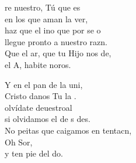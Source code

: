 \begin{cancion}%
	re nuestro, Tú que es \\
	en los que aman la ver,\\
	haz que el ino que por  se o\\
	llegue pronto a nuestro razn.\\
	Que el ar, que tu Hijo nos de, \\
	el A, habite noros.\jump\\
	\begin{chorus}%
		Y en el pan de la uni,\\
		Cristo danos Tu la .\\
		olvídate deuestroal\\
		si olvidamos el de s des. \\
		No peitas que caigamos en tentacn, \\
		Oh Sor,\\
		y ten pie del do.\jump\\
	\end{chorus}%
\end{cancion}%
